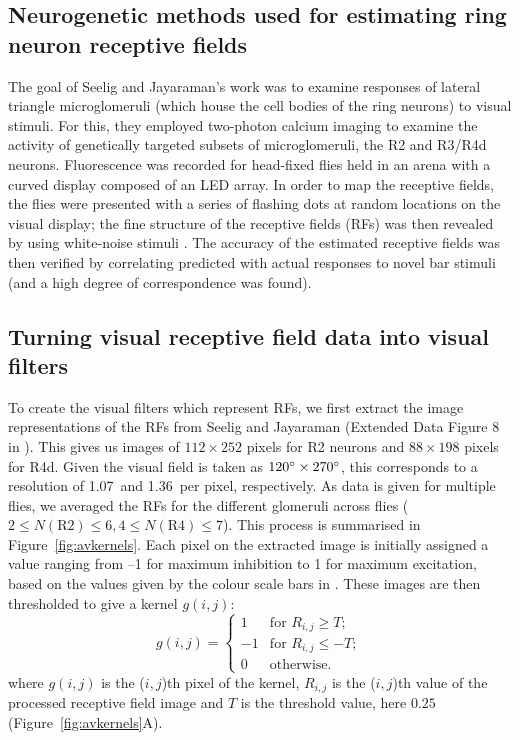 \subsection*{Neurogenetic methods used for estimating ring neuron receptive fields}
\label{sec:methods:seelig}

The goal of Seelig and Jayaraman's work \cite{Seelig2013} was to examine responses of lateral triangle microglomeruli (which house the cell bodies of the ring neurons) to visual stimuli.
For this, they employed two-photon calcium imaging to examine the activity of genetically targeted subsets of microglomeruli, the R2 and R3/R4d neurons.
Fluorescence was recorded for head-fixed flies held in an arena with a curved display composed of an LED array.
In order to map the receptive fields, the flies were presented with a series of flashing dots at random locations on the visual display; the fine structure of the receptive fields (\acp{RF}) was then revealed by using white-noise stimuli \cite{Weber2010}.
The accuracy of the estimated receptive fields was then verified by correlating predicted with actual responses to novel bar stimuli (and a high degree of correspondence was found).

\subsection*{Turning visual receptive field data into visual filters}
\label{sec:methods:preprocessing}
To create the visual filters which represent \acp{RF}, we first extract the image representations of the \acp{RF} from Seelig and Jayaraman (Extended Data Figure 8 in \cite{Seelig2013}).
This gives us images of $112\times 252$ pixels for R2 neurons and $88\times 198$ pixels for R4d.
Given the visual field is taken as $120\degree\times 270\degree$, this corresponds to a resolution of 1.07\degree\ and 1.36\degree\ per pixel, respectively.
As data is given for multiple flies, we averaged the \acp{RF} for the different glomeruli across flies ($2\le N(\mathrm{R2}) \le 6, 4\le N(\mathrm{R4})\le 7$).
This process is summarised in Figure~\ref{fig:avkernels}.
Each pixel on the extracted image is initially assigned a value ranging from --1 for maximum inhibition to 1 for maximum excitation, based on the values given by the colour scale bars in \cite{Seelig2013}.
These images are then thresholded to give a kernel $g(i,j)$:
$$
g(i,j) = \left\{ \begin{array}{rl}
1 & \mbox{for } R_{i,j} \ge T; \\
-1 & \mbox{for } R_{i,j} \le -T; \\
0 & \mbox{otherwise.}
\end{array}
\right.
$$
where $g(i,j)$ is the ($i,j$)th pixel of the kernel, $R_{i,j}$ is the ($i,j$)th value of the processed receptive field image and $T$ is the threshold value, here $0.25$ (Figure~\ref{fig:avkernels}A).

